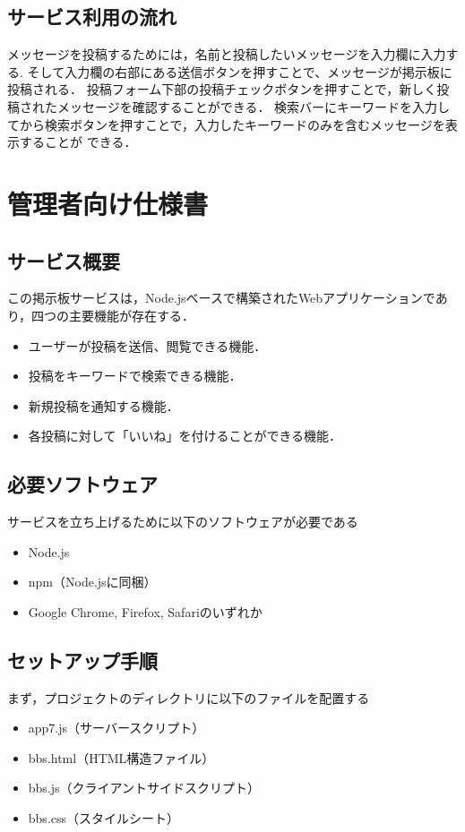 \documentclass[uplatex,dvipdfmx]{jsarticle}
\begin{document}
\subsection{サービス利用の流れ}
メッセージを投稿するためには，名前と投稿したいメッセージを入力欄に入力する.
そして入力欄の右部にある送信ボタンを押すことで、メッセージが掲示板に投稿される．
投稿フォーム下部の投稿チェックボタンを押すことで，新しく投稿されたメッセージを確認することができる．
検索バーにキーワードを入力してから検索ボタンを押すことで，入力したキーワードのみを含むメッセージを表示することが
できる．

\section{管理者向け仕様書}

\subsection{サービス概要}
この掲示板サービスは，Node.jsベースで構築されたWebアプリケーションであり，四つの主要機能が存在する．
\begin{itemize}
    \item ユーザーが投稿を送信、閲覧できる機能．
    \item 投稿をキーワードで検索できる機能．
    \item 新規投稿を通知する機能．
    \item 各投稿に対して「いいね」を付けることができる機能．
\end{itemize}

\subsection{必要ソフトウェア}
サービスを立ち上げるために以下のソフトウェアが必要である
\begin{itemize}
    \item Node.js
    \item npm（Node.jsに同梱）
    \item Google Chrome, Firefox, Safariのいずれか
\end{itemize}

\subsection{セットアップ手順}
まず，プロジェクトのディレクトリに以下のファイルを配置する
\begin{itemize}
    \item app7.js（サーバースクリプト）
    \item bbs.html（HTML構造ファイル）
    \item bbs.js（クライアントサイドスクリプト）
    \item bbs.css（スタイルシート）
\end{itemize}
\end{document}
